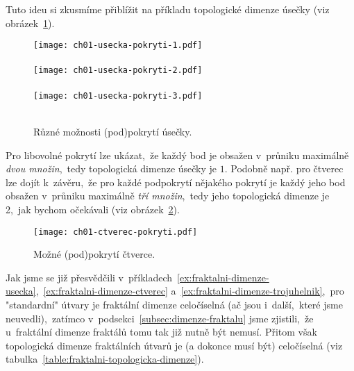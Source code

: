 
Tuto ideu si zkusmíme přiblížit na příkladu topologické dimenze úsečky (viz obrázek~\ref{fig:usecka-zjemneni}).
\begin{figure}[h]
    \centering
    \texttt{[image: ch01-usecka-pokryti-1.pdf]}\\\qquad\\
    \texttt{[image: ch01-usecka-pokryti-2.pdf]}\\\qquad\\
    \texttt{[image: ch01-usecka-pokryti-3.pdf]}\\\qquad\\
    \caption{Různé možnosti (pod)pokrytí úsečky.}
    \label{fig:usecka-zjemneni}
\end{figure}
Pro libovolné pokrytí lze ukázat,~že každý bod je obsažen v~průniku maximálně \emph{dvou množin},~tedy topologická dimenze úsečky je $1$. Podobně např. pro čtverec lze dojít k~závěru,~že pro každé podpokrytí nějakého pokrytí je každý jeho bod obsažen v~průniku maximálně \emph{tří množin},~tedy jeho topologická dimenze je 2,~jak bychom očekávali (viz obrázek~\ref{fig:ctverec-zjemneni}).
\begin{figure}[h]
    \centering
    \texttt{[image: ch01-ctverec-pokryti.pdf]}
    \caption{Možné (pod)pokrytí čtverce.}
    \label{fig:ctverec-zjemneni}
\end{figure}
Jak jsme se již přesvědčili v~příkladech~\ref{ex:fraktalni-dimenze-usecka},~\ref{ex:fraktalni-dimenze-ctverec} a~\ref{ex:fraktalni-dimenze-trojuhelnik},~pro "standardní" útvary je fraktální dimenze celočíselná (ač jsou i~další,~které jsme neuvedli),~zatímco v~podsekci~\ref{subsec:dimenze-fraktalu} jsme zjistili,~že u~fraktální dimenze fraktálů tomu tak již nutně být nemusí. Přitom však topologická dimenze fraktálních útvarů je (a dokonce musí být) celočíselná (viz tabulka~\ref{table:fraktalni-topologicka-dimenze}).
